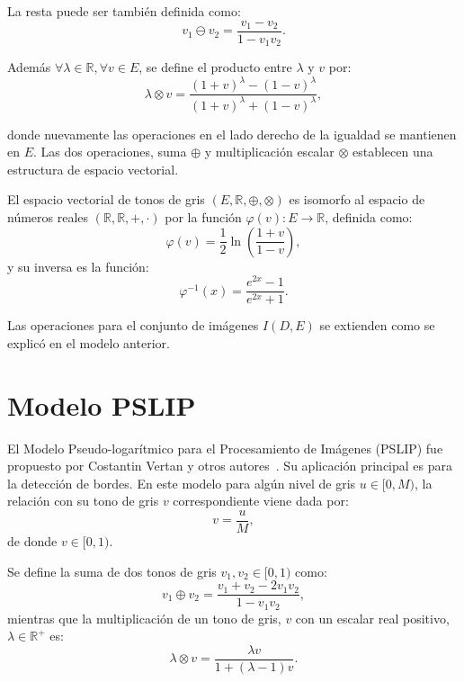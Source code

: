 La resta puede ser tambi\'en definida como:
\begin{equation}
	v_1\ominus v_2=\frac{v_1-v_2}{1-v_1v_2}.
\end{equation}

Adem\'as $\forall \lambda \in \mathbb{R}, \forall v \in E $, se define el producto entre $\lambda$ y $v$ por:
\begin{equation}
	\lambda \otimes v =\frac{(1+v)^\lambda-(1-v)^\lambda}{(1+v)^\lambda+(1-v)^\lambda},
\end{equation}

donde nuevamente las operaciones en el lado derecho de la igualdad se mantienen en $E$. Las dos operaciones, suma $\oplus$ y multiplicación escalar $\otimes$ establecen una estructura de espacio vectorial.

El espacio vectorial de tonos de gris $(E, \mathbb{R}, \oplus, \otimes)$ es isomorfo al espacio de números reales $(\mathbb{R},\mathbb{R}, +, \cdot)$ por la función $\varphi(v) : E \rightarrow \mathbb{R}$, definida como:
\begin{equation}
	\varphi(v)=\frac{1}{2}\ln\left(\frac{1+v}{1-v}\right),
\end{equation}
y su inversa es la funci\'on:
\begin{equation}
	\varphi^{-1}(x)=\frac{e^{2x}-1}{e^{2x}+1}.
\end{equation}

Las operaciones para el conjunto de im\'agenes $I(D,E)$ se extienden como se explic\'o en el modelo anterior.

\section{Modelo PSLIP}

El Modelo Pseudo-logar\'itmico para el Procesamiento de Im\'agenes (PSLIP) fue propuesto por Costantin Vertan y otros autores~\cite{vertan2008pseudo}. Su aplicaci\'on principal es para la detecci\'on de bordes. En este modelo para alg\'un nivel de gris $u\in[0,M)$, la relaci\'on con su tono de gris $v$ correspondiente viene dada por:
\begin{equation}
	v = \frac{u}{M},
\end{equation}
de donde $v\in[0,1)$.

Se define la suma de dos tonos de gris $v_1,v_2\in[0,1)$ como:
\begin{equation}
	v_1\oplus v_2=\frac{v_1 + v_2 - 2v_1v_2}{1-v_1v_2},
\end{equation}
mientras que la multiplicación de un tono de gris, $v$ con un escalar real positivo, $\lambda \in \mathbb{R}^+$ es:
\begin{equation}
	\lambda \otimes v = \frac{\lambda v}{1+(\lambda-1)v}.
\end{equation}


